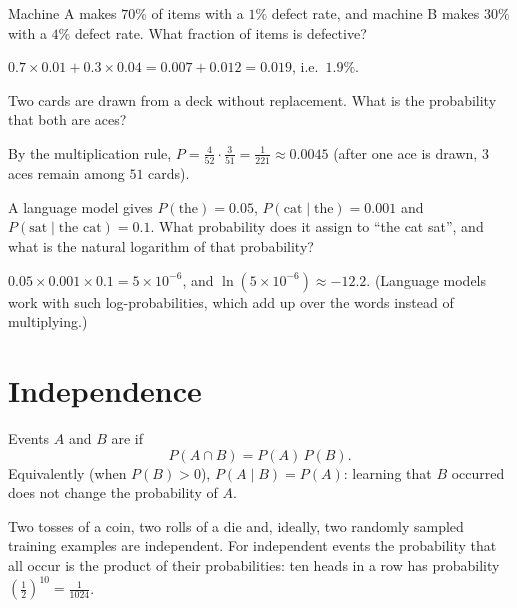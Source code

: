 \begin{exercise}
Machine A makes $70\%$ of items with a $1\%$ defect rate, and machine B makes
$30\%$ with a $4\%$ defect rate. What fraction of items is defective?
\end{exercise}
\begin{solution}
$0.7\times0.01 + 0.3\times0.04 = 0.007 + 0.012 = 0.019$, i.e.\ $1.9\%$.
\end{solution}

\begin{exercise}
Two cards are drawn from a deck without replacement. What is the probability
that both are aces?
\end{exercise}
\begin{solution}
By the multiplication rule, $P = \tfrac{4}{52}\cdot\tfrac{3}{51} = \tfrac{1}{221}
\approx 0.0045$ (after one ace is drawn, $3$ aces remain among $51$ cards).
\end{solution}

\begin{exercise}
A language model gives $P(\text{the}) = 0.05$, $P(\text{cat} \mid \text{the}) =
0.001$ and $P(\text{sat} \mid \text{the cat}) = 0.1$. What probability does it
assign to ``the cat sat'', and what is the natural logarithm of that probability?
\end{exercise}
\begin{solution}
$0.05\times0.001\times0.1 = 5\times10^{-6}$, and $\ln(5\times10^{-6}) \approx
-12.2$. (Language models work with such log-probabilities, which add up over the
words instead of multiplying.)
\end{solution}

\section{Independence}\label{sec:independence-events}

\begin{definition}\label{def:independence}
Events $A$ and $B$ are  if
\[
  P(A \cap B) = P(A)\,P(B).
\]
Equivalently (when $P(B) > 0$), $P(A \mid B) = P(A)$: learning that $B$ occurred
does not change the probability of $A$.
\end{definition}

Two tosses of a coin, two rolls of a die and, ideally, two randomly sampled
training examples are independent. For independent events the probability that
all occur is the product of their probabilities: ten heads in a row has
probability $\left(\frac12\right)^{10} = \frac{1}{1024}$.

